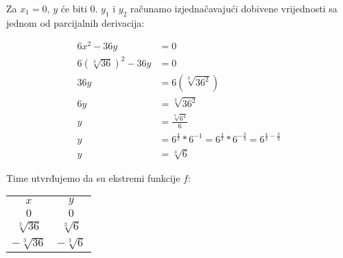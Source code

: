 Za $x_1 = 0$, $y$ će biti 0. $y_1$ i $y_2$ računamo izjednačavajući dobivene vrijednosti sa jednom od parcijalnih derivacija:

\begin{align*}
    6x^2 - 36y &= 0\\
    6(\sqrt[3]{36})^2 - 36y &= 0\\
    36y &= 6(\sqrt[3]{36^2})\\
    6y &= \sqrt[3]{36^2} \\
    y &= \frac{\sqrt[3]{6^4}}{6} \\
    y &= 6^{\frac{4}{3}} * 6^{-1} = 6^{\frac{4}{3}} * 6^{-\frac{3}{3}} = 6^{\frac{4}{3} - \frac{3}{3}} \\
    y &= \sqrt[3]6
\end{align*}

Time utvrđujemo da su ekstremi funkcije $f$:

\begin{center}
\begin{tabular}{c c}
    $x$ & $y$ \\
    $0$ & $0$ \\
    $\sqrt[3]{36}$ & $\sqrt[3]6$ \\
    $-\sqrt[3]{36}$ & $-\sqrt[3]6$ \\
\end{tabular}
\end{center}

\newpage